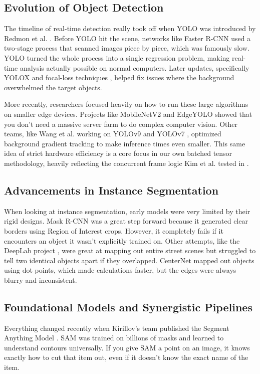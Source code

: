 \documentclass[10pt, conference]{IEEEtran}
\begin{document}
\subsection{Evolution of Object Detection}
The timeline of real-time detection really took off when YOLO was introduced by Redmon et al. \cite{b4}. Before YOLO hit the scene, networks like Faster R-CNN \cite{b5} used a two-stage process that scanned images piece by piece, which was famously slow. YOLO turned the whole process into a single regression problem, making real-time analysis actually possible on normal computers. Later updates, specifically YOLOX \cite{b6} and focal-loss techniques \cite{b7}, helped fix issues where the background overwhelmed the target objects. 

More recently, researchers focused heavily on how to run these large algorithms on smaller edge devices. Projects like MobileNetV2 \cite{b12} and EdgeYOLO \cite{b8} showed that you don't need a massive server farm to do complex computer vision. Other teams, like Wang et al. working on YOLOv9 \cite{b9} and YOLOv7 \cite{b10}, optimized background gradient tracking to make inference times even smaller. This same idea of strict hardware efficiency is a core focus in our own batched tensor methodology, heavily reflecting the concurrent frame logic Kim et al. tested in \cite{b2}.

\subsection{Advancements in Instance Segmentation}
When looking at instance segmentation, early models were very limited by their rigid designs. Mask R-CNN \cite{b13} was a great step forward because it generated clear borders using Region of Interest crops. However, it completely fails if it encounters an object it wasn't explicitly trained on. Other attempts, like the DeepLab project \cite{b14}, were great at mapping out entire street scenes but struggled to tell two identical objects apart if they overlapped. CenterNet \cite{b15} mapped out objects using dot points, which made calculations faster, but the edges were always blurry and inconsistent.

\subsection{Foundational Models and Synergistic Pipelines}
Everything changed recently when Kirillov's team published the Segment Anything Model \cite{b1}. SAM was trained on billions of masks and learned to understand contours universally. If you give SAM a point on an image, it knows exactly how to cut that item out, even if it doesn't know the exact name of the item. 
\end{document}
